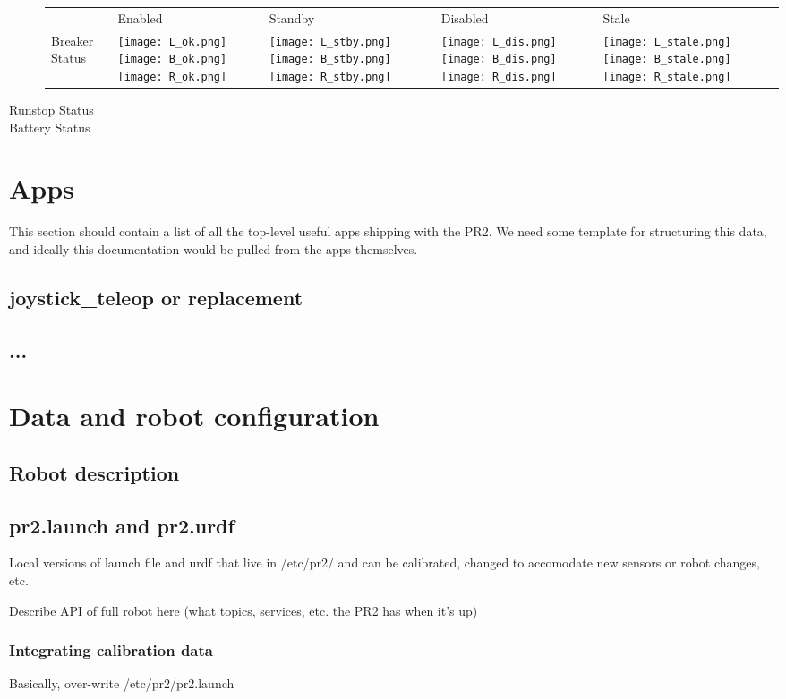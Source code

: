 \begin{description}
    \begin{tabular}{m{3cm}SSSS}
     & Enabled & Standby & Disabled & Stale\\
    Breaker Status & \texttt{[image: L\_ok.png]}\texttt{[image: B\_ok.png]}\texttt{[image: R\_ok.png]}&
                     \texttt{[image: L\_stby.png]}\texttt{[image: B\_stby.png]}\texttt{[image: R\_stby.png]}&
                     \texttt{[image: L\_dis.png]}\texttt{[image: B\_dis.png]}\texttt{[image: R\_dis.png]}&
                     \texttt{[image: L\_stale.png]}\texttt{[image: B\_stale.png]}\texttt{[image: R\_stale.png]}\\


   \end{tabular}



\item[Runstop Status]

\item[Battery Status]

\end{description}

\section{Apps}
This section should contain a list of all the top-level useful apps shipping with the PR2.  We need some template for structuring this data, and ideally this documentation would be pulled from the apps themselves.

\subsection{joystick\_teleop or replacement}
\subsection{...}
\section{Data and robot configuration}
\subsection{Robot description}
\subsection{pr2.launch and pr2.urdf}
Local versions of launch file and urdf that live in /etc/pr2/ and can be calibrated, changed to accomodate new sensors or robot changes, etc.

Describe API of full robot here (what topics, services, etc. the PR2 has when it's up)
\subsubsection{Integrating calibration data}
Basically, over-write /etc/pr2/pr2.launch

